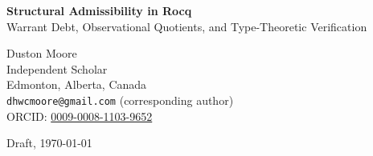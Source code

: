 \documentclass[12pt]{article}
\theoremstyle{plain}
\theoremstyle{definition}
\theoremstyle{remark}
\begin{document}

\begin{titlepage}
\centering
\vspace*{2cm}

{\LARGE\bfseries Structural Admissibility in Rocq}\\[0.6em]
{\large Warrant Debt, Observational Quotients, and Type-Theoretic Verification}

\vspace{1.8cm}

{\large Duston Moore}\\[0.3em]
{\normalsize Independent Scholar}\\[0.2em]
{\normalsize Edmonton, Alberta, Canada}\\[0.2em]
{\normalsize \texttt{dhwcmoore@gmail.com} (corresponding author)}\\[0.2em]
{\normalsize ORCID: \href{https://orcid.org/0009-0008-1103-9652}{0009-0008-1103-9652}}

\vspace{1.5cm}

{\normalsize Draft, \today}

\vspace{2.5cm}

\begin{abstract}
\noindent
Verification can fail before proof search begins. When the observation
map of a verification system conflates states that a correctness
predicate must distinguish, the verification question is malformed:
the required information has already been destroyed by the
observational quotient.

We formalise this condition as admissibility. A predicate is admissible
exactly when it factors through the equivalence relation induced by
observation, or equivalently when the observation-induced quotient is
fine enough to preserve the distinctions the predicate requires.

For perturbation systems, we introduce warrant debt as the operational
witness of admissibility failure: warrant debt occurs when algebraic
observation treats two perturbations as equivalent while empirical
evidence distinguishes them. The Warrant Debt Theorem is proved in
Rocq: whenever warrant debt exists, the corresponding empirical
tolerance predicate is not admissible.


\end{abstract}
\end{titlepage}
\end{document}
